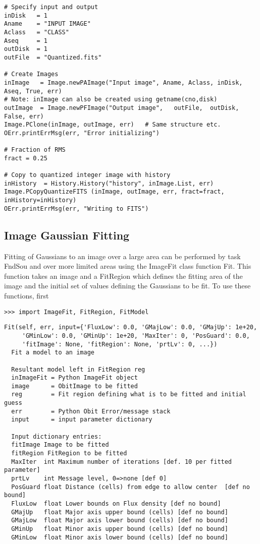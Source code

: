 \documentclass[11pt]{report}
\begin{document}
\begin{verbatim}
# Specify input and output
inDisk   = 1
Aname    = "INPUT IMAGE"
Aclass   = "CLASS"
Aseq     = 1
outDisk  = 1
outFile  = "Quantized.fits"

# Create Images
inImage   = Image.newPAImage("Input image", Aname, Aclass, inDisk, Aseq, True, err)
# Note: inImage can also be created using getname(cno,disk)
outImage  = Image.newPFImage("Output image",   outFile,  outDisk,  False, err)
Image.PClone(inImage, outImage, err)   # Same structure etc.
OErr.printErrMsg(err, "Error initializing")

# Fraction of RMS 
fract = 0.25

# Copy to quantized integer image with history
inHistory  = History.History("history", inImage.List, err)
Image.PCopyQuantizeFITS (inImage, outImage, err, fract=fract, inHistory=inHistory)
OErr.printErrMsg(err, "Writing to FITS")
\end{verbatim}

\subsection{Image Gaussian Fitting}
Fitting of Gaussians to an image over a large area can be performed by
task FndSou and over more limited areas using the ImageFit class
function Fit.  This function takes an image and a FitRegion which
defines the fitting area of the image and the initial set of values
defining the Gaussians to be fit.  
To use these functions, first
\begin{verbatim}
>>> import ImageFit, FitRegion, FitModel
\end{verbatim}
\begin{verbatim}
Fit(self, err, input={'FluxLow': 0.0, 'GMajLow': 0.0, 'GMajUp': 1e+20, 
     'GMinLow': 0.0, 'GMinUp': 1e+20, 'MaxIter': 0, 'PosGuard': 0.0, 
     'fitImage': None, 'fitRegion': None, 'prtLv': 0, ...})
  Fit a model to an image
 
  Resultant model left in FitRegion reg
  inImageFit = Python ImageFit object
  image      = ObitImage to be fitted
  reg        = Fit region defining what is to be fitted and initial guess
  err        = Python Obit Error/message stack
  input      = input parameter dictionary
 
  Input dictionary entries:
  fitImage Image to be fitted
  fitRegion FitRegion to be fitted
  MaxIter  int Maximum number of iterations [def. 10 per fitted parameter]
  prtLv    int Message level, 0=>none [def 0]
  PosGuard float Distance (cells) from edge to allow center  [def no bound]
  FluxLow  float Lower bounds on Flux density [def no bound]
  GMajUp   float Major axis upper bound (cells) [def no bound]
  GMajLow  float Major axis lower bound (cells) [def no bound]
  GMinUp   float Minor axis upper bound (cells) [def no bound]
  GMinLow  float Minor axis lower bound (cells) [def no bound]
\end{verbatim}
\end{document}
